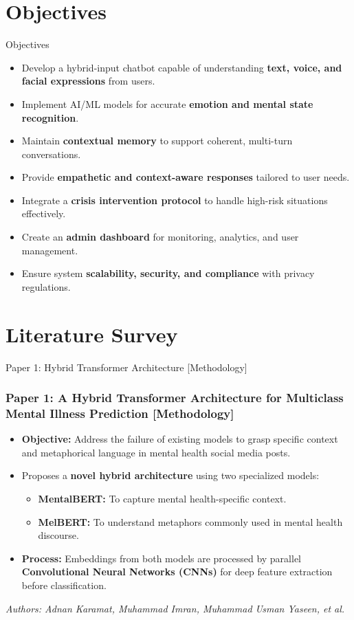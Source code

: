 \documentclass[11pt]{beamer}
\begin{document}
	\section{Objectives}
		\begin{frame}{Objectives}
			\justifying
   \normalsize
			\begin{itemize}
			      \item Develop a hybrid-input chatbot capable of understanding \textbf{text, voice, and facial expressions} from users.
    \item Implement AI/ML models for accurate \textbf{emotion and mental state recognition}.
    \item Maintain \textbf{contextual memory} to support coherent, multi-turn conversations.
    \item Provide \textbf{empathetic and context-aware responses} tailored to user needs.
    \item Integrate a \textbf{crisis intervention protocol} to handle high-risk situations effectively.
    \item Create an \textbf{admin dashboard} for monitoring, analytics, and user management.
    \item Ensure system \textbf{scalability, security, and compliance} with privacy regulations.
			\end{itemize}
		\end{frame}
  
\section{Literature Survey}
\begin{frame}{Paper 1: Hybrid Transformer Architecture [Methodology]}
\frametitle{Paper 1: A Hybrid Transformer Architecture for Multiclass Mental Illness Prediction [Methodology]}
\begin{itemize}
    \item \textbf{Objective:} Address the failure of existing models to grasp specific context and metaphorical language in mental health social media posts.
    \item Proposes a \textbf{novel hybrid architecture} using two specialized models:
    \begin{itemize}
        \item \textbf{MentalBERT:} To capture mental health-specific context.
        \item \textbf{MelBERT:} To understand metaphors commonly used in mental health discourse.
    \end{itemize}
    \item \textbf{Process:} Embeddings from both models are processed by parallel \textbf{Convolutional Neural Networks (CNNs)} for deep feature extraction before classification.
\end{itemize}
\vfill
\small{\textit{Authors: Adnan Karamat, Muhammad Imran, Muhammad Usman Yaseen, et al.}}
\end{frame}
\end{document}

